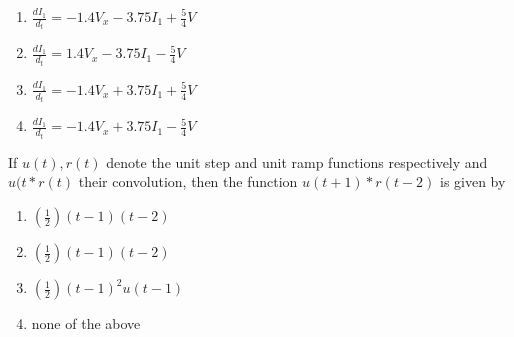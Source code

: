 \begin{enumerate}
    \item $\frac{dI_1}{d_t}=-1.4V_x-3.75I_1+\frac{5}{4}V$
    \item $\frac{dI_1}{d_t}=1.4V_x-3.75I_1-\frac{5}{4}V$
    \item $\frac{dI_1}{d_t}=-1.4V_x+3.75I_1+\frac{5}{4}V$
    \item $\frac{dI_1}{d_t}=-1.4V_x+3.75I_1-\frac{5}{4}V$
\end{enumerate}

\item If $u(t),r(t)$ denote the unit step and unit ramp functions respectively and $u(t*r(t)$ their convolution, then the function $u(t+1)*r(t-2)$ is given by
\begin{enumerate}
    \item $(\frac{1}{2})(t-1)(t-2)$
    \item $(\frac{1}{2})(t-1)(t-2)$
    \item $(\frac{1}{2})(t-1)^2u(t-1)$
    \item none of the above
\end{enumerate}